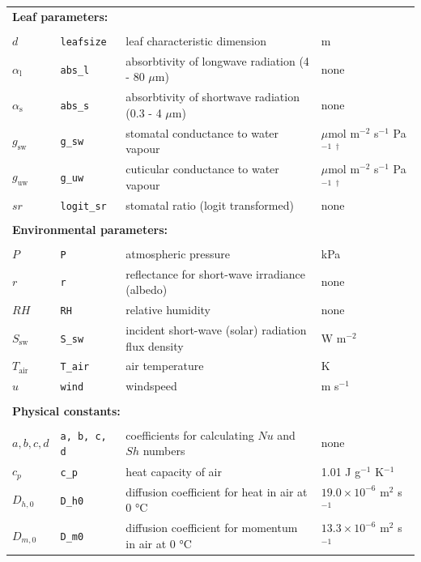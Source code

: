 \documentclass[11pt, oneside]{article}
\newcommand{\code}[1]{{\texttt{#1}}}
\begin{document}
\begin{table}[ht]
\begin{center}
{\begin{tabular}{llll}
  \multicolumn{4}{l}{\textbf{Leaf parameters:}} \\
  \\
  $d$                 & \code{leafsize}  & leaf characteristic dimension & m \\
  $\alpha_\mathrm{l}$ & \code{abs\_l}    & absorbtivity of longwave radiation (4 - 80 $\mu$m) & none \\
  $\alpha_\mathrm{s}$ & \code{abs\_s}    & absorbtivity of shortwave radiation (0.3 - 4 $\mu$m) & none \\
  $g_\mathrm{sw}$     & \code{g\_sw}     & stomatal conductance to water vapour & $\mu$mol m$^{-2}$ s$^{-1}$ Pa$^{-1}$ $^\dagger$ \\
  $g_\mathrm{uw}$     & \code{g\_uw}     & cuticular conductance to water vapour & $\mu$mol m$^{-2}$ s$^{-1}$ Pa$^{-1}$ $^\dagger$ \\
  $\mathit{sr}$       & \code{logit\_sr} & stomatal ratio (logit transformed) & none \\
  \\
  \multicolumn{4}{l}{\textbf{Environmental parameters:}} \\
  \\
  $P$              & \code{P}       & atmospheric pressure & kPa \\
  $r$              & \code{r}       & reflectance for short-wave irradiance (albedo) & none \\
  $\mathit{RH}$    & \code{RH}      & relative humidity    & none \\
  $S_\mathrm{sw}$  & \code{S\_sw}   & incident short-wave (solar) radiation flux density & W m$^{-2}$ \\
  $T_\mathrm{air}$ & \code{T\_air}  & air temperature      & K \\
  $u$              & \code{wind}    & windspeed            & m s$^{-1}$ \\
  \\
  \multicolumn{4}{l}{\textbf{Physical constants:}} \\
  \\
  $a, b, c, d$     & \code{a, b, c, d} & coefficients for calculating $\mathit{Nu}$ and $\mathit{Sh}$ numbers & none \\
  $c_p$            & \code{c\_p}    & heat capacity of air & 1.01 J g$^{-1}$ K$^{-1}$ \\
  $D_{h,0}$        & \code{D\_h0}   & diffusion coefficient for heat in air at 0 °C & $19.0 \times 10^{-6}$ m$^2$ s$^{-1}$ \\
  $D_{m,0}$        & \code{D\_m0}   & diffusion coefficient for momentum in air at 0 °C & $13.3 \times 10^{-6}$ m$^2$ s$^{-1}$ \\

\end{tabular}}
\end{center}
\end{table}
\end{document}
